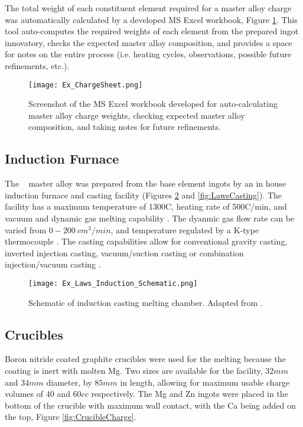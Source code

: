\documentclass[a4paper,12pt,oneside]{report}%
\begin{document}
The total weight of each constituent element required for a master alloy charge was automatically calculated by a developed MS Excel workbook, Figure \ref{fig:ChargeSheet}. This tool auto-computes the required weights of each element from the prepared ingot innovatory, checks the expected master alloy composition, and provides a space for notes on the entire process (i.e. heating cycles, observations, possible future refinements, etc.).

\begin{figure}[htbp]
	\centering
	\texttt{[image: Ex\_ChargeSheet.png]}
	\caption{Screenshot of the MS Excel workbook developed for auto-calculating master alloy charge weights, checking expected master alloy composition, and taking notes for future refinements.}
	\label{fig:ChargeSheet}
\end{figure}

\subsection{Induction Furnace}

The \MgZnCa~ master alloy was prepared from the base element ingots by an in house induction furnace and casting facility (Figures \ref{fig:CastingSchematic} and \ref{fig:LawsCasting}). The facility has a maximum temperature of 1300\degree C, heating rate of 500\degree C/min, and vacuum and dynamic gas melting capability \cite{Laws2007}. The dyanmic gas flow rate can be varied from $0-200~ cm^{3}/min$, and temperature regulated by a K-type thermocouple \cite{Laws2007}. The casting capabilities allow for conventional gravity casting, inverted injection casting, vacuum/suction casting or combination injection/vacuum casting \cite{Laws2007}.

\begin{figure}[htbp]
	\centering
	\texttt{[image: Ex\_Laws\_Induction\_Schematic.png]}
	\caption[Schematic of induction casting melting chamber.]{Schematic of induction casting melting chamber. Adapted from \cite{Laws2007}.}
	\label{fig:CastingSchematic}
\end{figure}

\subsection{Crucibles}

Boron nitride coated graphite crucibles were used for the melting because the coating is inert with molten Mg. Two sizes are available for the facility, $32 mm$ and $34 mm$ diameter, by $85 mm$ in length, allowing for maximum usable charge volumes of $40$ and $60 cc$ respectively. The Mg and Zn ingots were placed in the bottom of the crucible with maximum wall contact, with the Ca being added on the top, Figure \ref{fig:CrucibleCharge}.
\end{document}
